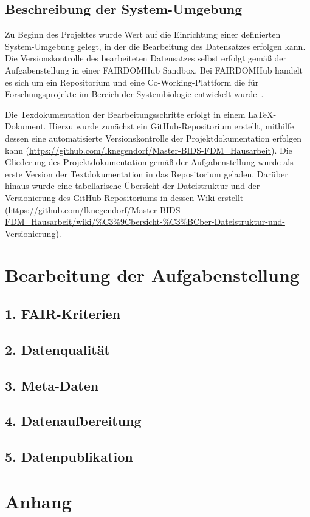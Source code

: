 \documentclass[12pt,a4paper,toc=bibliographynumbered,toc=indenttextentries]{scrreprt}
\begin{document}
		\section{Beschreibung der System-Umgebung}
		Zu Beginn des Projektes wurde Wert auf die Einrichtung einer definierten System-Umgebung gelegt, in der die Bearbeitung des Datensatzes erfolgen kann.
		Die Versionskontrolle des bearbeiteten Datensatzes selbst erfolgt gemäß der Aufgabenstellung in einer FAIRDOMHub Sandbox. Bei FAIRDOMHub handelt es sich um ein Repositorium und eine Co-Working-Plattform die für Forschungsprojekte im Bereich der Systembiologie entwickelt wurde~\cite{10.1093/nar/gkw1032}.\par  
		Die Texdokumentation der Bearbeitungsschritte erfolgt in einem \LaTeX{}-Dokument. Hierzu wurde zunächst ein GitHub-Repositorium erstellt, mithilfe dessen eine automatisierte Versionskontrolle der Projektdokumentation erfolgen kann (\url{https://github.com/lknegendorf/Master-BIDS-FDM_Hausarbeit}). Die Gliederung des Projektdokumentation gemäß der Aufgabenstellung wurde als erste Version der Textdokumentation in das Repositorium geladen. Darüber hinaus wurde eine tabellarische Übersicht der Dateistruktur und der Versionierung des GitHub-Repositoriums in dessen Wiki erstellt (\url{https://github.com/lknegendorf/Master-BIDS-FDM_Hausarbeit/wiki/%C3%9Cbersicht-%C3%BCber-Dateistruktur-und-Versionierung}).  
		
	\chapter{Bearbeitung der Aufgabenstellung}
		
		\section*{1. FAIR-Kriterien}
	
		\section*{2. Datenqualität}
	
		\section*{3. Meta-Daten}
	
		\section*{4. Datenaufbereitung}
	
		\section*{5. Datenpublikation}
	
	\clearpage
	\singlespacing
	
	\clearpage
				
	\chapter{Anhang}
	
\end{document}

